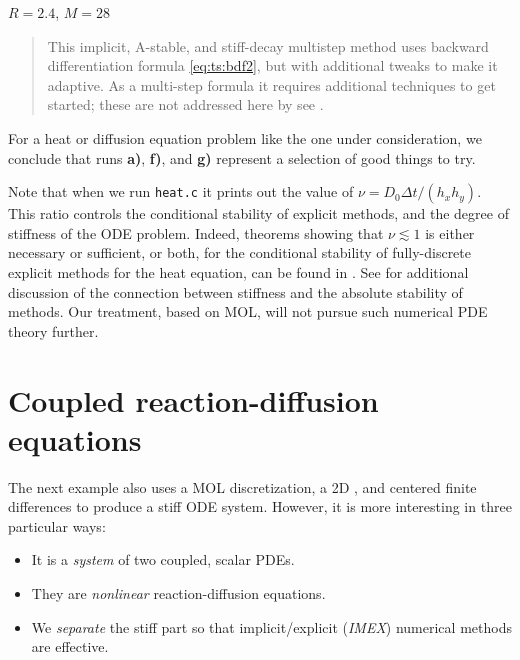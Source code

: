 \begin{enumerate}
\hfill $R=2.4$, $M=28$
\begin{quote} This implicit, A-stable, and stiff-decay multistep method \citep{AscherPetzold1998} uses backward differentiation formula \eqref{eq:ts:bdf2}, but with additional tweaks to make it adaptive.  As a multi-step formula it requires additional techniques to get started; these are not addressed here by see \citep{Butcher2008}.\end{quote}
\end{enumerate}

For a heat or diffusion equation problem like the one under consideration, we conclude that runs \textbf{a)}, \textbf{f)}, and \textbf{g)} represent a selection of good things to try.

Note that when we run \texttt{heat.c} it prints out the value of $\nu = D_0 \Delta t / (h_x h_y)$.  This ratio controls the conditional stability of explicit methods, and the degree of stiffness of the ODE problem.  Indeed, theorems showing that $\nu \lesssim 1$ is either necessary or sufficient, or both, for the conditional stability of fully-discrete explicit methods for the heat equation, can be found in \citep{MortonMayers2005}.  See \citep{LeVeque2007} for additional discussion of the connection between stiffness and the absolute stability of methods.  Our treatment, based on MOL, will not pursue such numerical PDE theory further.


\section{Coupled reaction-diffusion equations}

The next example also uses a MOL discretization, a 2D \pDMDA, and centered finite differences to produce a stiff ODE system.  However, it is more interesting in three particular ways:
\begin{itemize}
\item It is a \emph{system} of two coupled, scalar PDEs.
\item They are \emph{nonlinear} reaction-diffusion equations.
\item We \emph{separate} the stiff part so that implicit/explicit (\emph{IMEX}) numerical methods are effective.
\end{itemize}

